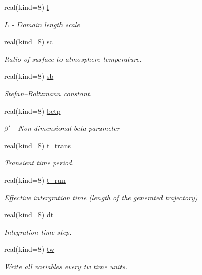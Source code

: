 \begin{DoxyCompactItemize}
real(kind=8) \hyperlink{namespaceparams_aa2b032a17c85d2069ca59212ad8309a1}{l}
\begin{DoxyCompactList}\small\item\em $L$ -\/ Domain length scale \end{DoxyCompactList}\item 
real(kind=8) \hyperlink{namespaceparams_a35c130eb539b9df8c52cc02427913cc0}{sc}
\begin{DoxyCompactList}\small\item\em Ratio of surface to atmosphere temperature. \end{DoxyCompactList}\item 
real(kind=8) \hyperlink{namespaceparams_a7e4a380117958612bc5cf4cac910b483}{sb}
\begin{DoxyCompactList}\small\item\em Stefan–\+Boltzmann constant. \end{DoxyCompactList}\item 
real(kind=8) \hyperlink{namespaceparams_a9ffe87bb8aaab8a0d4f8d5f644b98785}{betp}
\begin{DoxyCompactList}\small\item\em $\beta'$ -\/ Non-\/dimensional beta parameter \end{DoxyCompactList}\item 
real(kind=8) \hyperlink{namespaceparams_aabf0943afa2272a8bbbd58c49ad0db38}{t\+\_\+trans}
\begin{DoxyCompactList}\small\item\em Transient time period. \end{DoxyCompactList}\item 
real(kind=8) \hyperlink{namespaceparams_a923cab407956c82921069b7ec0e69eb9}{t\+\_\+run}
\begin{DoxyCompactList}\small\item\em Effective intergration time (length of the generated trajectory) \end{DoxyCompactList}\item 
real(kind=8) \hyperlink{namespaceparams_a2d658dc74d6a45a2e71b06bde97df084}{dt}
\begin{DoxyCompactList}\small\item\em Integration time step. \end{DoxyCompactList}\item 
real(kind=8) \hyperlink{namespaceparams_a0955c0296092bb15d2dcd120d72ad479}{tw}
\begin{DoxyCompactList}\small\item\em Write all variables every tw time units. \end{DoxyCompactList}\item 

\end{DoxyCompactItemize}

